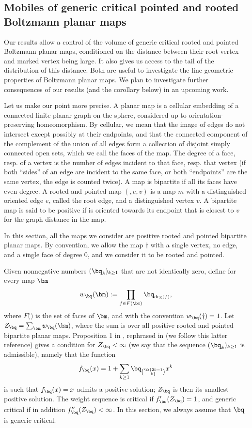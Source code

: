 \documentclass[10pt,a4paper]{article}
\begin{document}
\subsection{Mobiles of generic critical pointed and rooted Boltzmann planar maps}
\label{sec:mobile}


Our results allow a control of the volume of generic critical rooted and pointed Boltzmann planar maps, conditioned on the distance between their root vertex and marked vertex being large. It also gives us access to the tail of the distribution of this distance. Both are useful to investigate the fine geometric properties of Boltzmann planar maps. We plan to investigate further consequences of our results (and the corollary below) in an upcoming work. 

Let us make our point more precise. 	 
A planar map is a cellular embedding of a connected finite planar graph on the sphere, considered up to orientation-preserving homeomorphism. By cellular, we mean that the image of edges do not intersect except possibly at their endpoints, and that the connected component of the complement of the union of all edges form a collection of disjoint simply connected open sets, which we call the faces of the map. The degree of a face, resp. of a vertex is the number of edges incident to that face, resp. that vertex (if both ``sides'' of an edge are incident to the same face, or both ``endpoints'' are the same vertex, the edge is counted twice). A map is bipartite if all its faces have even degree. A rooted and pointed map $(\bm, e, v)$ is a map $m$ with a distinguished oriented edge $e$, called the root edge, and a distinguished vertex $v$. A bipartite map is said to be positive if is oriented towards its endpoint that is closest to $v$ for the graph distance in the map. 




In this section, all the maps we consider are positive rooted and pointed bipartite planar maps. 
By convention, we allow the map $\dagger$ with a single vertex, no edge, and a single face of degree $0$, and we consider it to be rooted and pointed. 

Given nonnegative numbers $(\bq_k)_{k\geq 1}$ that are not identically zero, define for every map $\bm$
\[ w_\bq(\bm) := \prod_{f\in F(\bm)} \bq_{\deg(f)} , \]
where $F(\bm)$ is the set of faces of $\bm$, and with the convention $w_\bq(\dagger) = 1$. Let $Z_\bq = \sum_{\bm} w_\bq(\bm)$, where the sum is over all positive rooted and pointed bipartite planar maps. Proposition 1 in \cite{marckert2007invariance}, rephrased in \cite[Section 3.2.2]{curien2019peeling} (we follow this latter reference) gives a condition for $Z_\bq < \infty$ (we say that the sequence $(\bq_k)_{k\geq 1}$ is admissible), namely that the function
\[ f_\bq(x) = 1 + \sum_{k\geq 1} \bq_\bk {{2k-1}\choose k} x^k \]
is such that $f_\bq(x) = x$ admits a positive solution; $Z_\bq$ is then its smallest positive solution. The weight sequence is critical if $f_\bq'(Z_\bq) = 1$, and generic critical if in addition $f_\bq''(Z_\bq) < \infty$. In this section, we always assume that $\bq$ is generic critical. 
\end{document}
